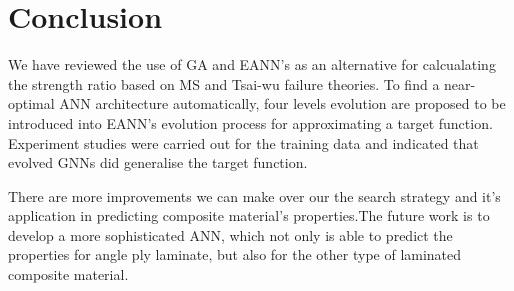 \section{Conclusion}
We have reviewed the use of GA and EANN's as an alternative for calcualating
the strength ratio based on MS and Tsai-wu failure theories. To find a
near-optimal ANN architecture automatically, four levels evolution are proposed
to be introduced into EANN's evolution process for approximating a target
function. Experiment studies were carried out for the training data and
indicated that evolved GNNs did generalise the target function.

There are more improvements we can make over our the search strategy and it's
application in predicting composite material's properties.The future work is to
develop a more sophisticated ANN, which not only is able to predict the
properties for angle ply laminate, but also for the other type of laminated
composite material.
